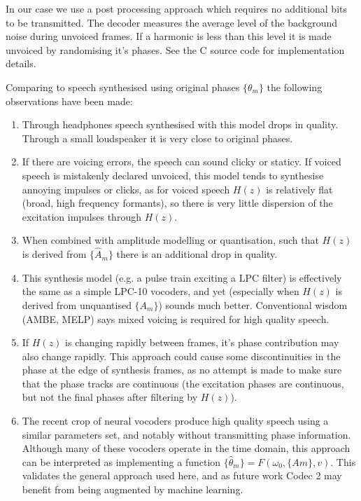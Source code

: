 \documentclass{article}
\begin{document}
In our case we use a post processing approach which requires no additional bits to be transmitted.  The decoder measures the average level of the background noise during unvoiced frames.  If a harmonic is less than this level it is made unvoiced by randomising it's phases.  See the C source code for implementation details.

Comparing to speech synthesised using original phases $\{\theta_m\}$ the following observations have been made:
\begin{enumerate}
\item Through headphones speech synthesised with this model drops in quality. Through a small loudspeaker it is very close to original phases.
\item If there are voicing errors, the speech can sound clicky or staticy.  If voiced speech is mistakenly declared unvoiced, this model tends to synthesise annoying impulses or clicks, as for voiced speech $H(z)$ is relatively flat (broad, high frequency formants), so there is very little dispersion of the excitation impulses through $H(z)$.
\item When combined with amplitude modelling or quantisation, such that $H(z)$ is derived from $\{\hat{A}_m\}$ there is an additional drop in quality.
\item This synthesis model (e.g. a pulse train exciting a LPC filter) is effectively the same as a simple LPC-10 vocoders, and yet (especially when $H(z)$ is derived from unquantised $\{A_m\}$) sounds much better.  Conventional wisdom (AMBE, MELP) says mixed voicing is required for high quality speech.
\item If $H(z)$ is changing rapidly between frames, it's phase contribution may also change rapidly. This approach could cause some discontinuities in the phase at the edge of synthesis frames, as no attempt is made to make sure that the phase tracks are continuous (the excitation phases are continuous, but not the final phases after filtering by $H(z)$).
\item The recent crop of neural vocoders produce high quality speech using a similar parameters set, and notably without transmitting phase information.  Although many of these vocoders operate in the time domain, this approach can be interpreted as implementing a function $\{ \hat{\theta}_m\} = F(\omega_0, \{Am\},v)$.  This validates the general approach used here, and as future work Codec 2 may benefit from being augmented by machine learning.
\end{enumerate}
\end{document}
